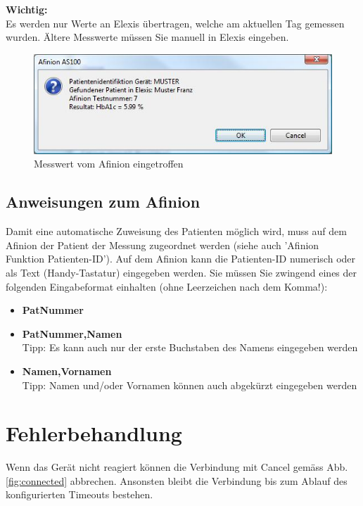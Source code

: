 \documentclass[a4paper]{scrartcl}
\begin{document}
\\
\\
\textbf{Wichtig:}\\
Es werden nur Werte an Elexis \"ubertragen, welche am aktuellen Tag gemessen wurden. \"Altere Messwerte m\"ussen Sie manuell in Elexis eingeben.
\begin{figure}[h]
    \includegraphics{messwert}
    \caption{Messwert vom Afinion eingetroffen}
    \label{fig:messwert}
\end{figure}

\subsection{Anweisungen zum Afinion}
Damit eine automatische Zuweisung des Patienten m\"oglich wird, muss auf dem Afinion der Patient der Messung zugeordnet werden (siehe auch 'Afinion Funktion Patienten-ID'). Auf dem Afinion kann die Patienten-ID numerisch oder als Text (Handy-Tastatur) eingegeben werden. Sie m\"ussen Sie zwingend eines der folgenden Eingabeformat einhalten (ohne Leerzeichen nach dem Komma!):\\
\begin{itemize}
\item \textbf{PatNummer}
\item \textbf{PatNummer,Namen}\\Tipp: Es kann auch nur der erste Buchstaben des Namens eingegeben werden
\item \textbf{Namen,Vornamen}\\Tipp: Namen und/oder Vornamen k\"onnen auch abgek\"urzt eingegeben werden
\end{itemize}

\section{Fehlerbehandlung}
Wenn das Ger\"at nicht reagiert k\"onnen die Verbindung mit Cancel gem\"ass Abb. \ref{fig:connected} abbrechen. Ansonsten bleibt die Verbindung bis zum Ablauf des konfigurierten Timeouts bestehen.\\
\end{document}

